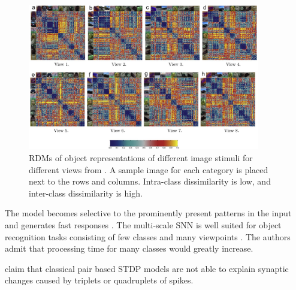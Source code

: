 \begin{figure}[htbp]
    \center
    \includegraphics[width=0.9\textwidth]{pictures/inter_intra_category_dissimilarity.jpg}
    \caption{\acp{RDM} of object representations of different image stimuli for different views from \cite{multi_scale_STDP}.
    A sample image for each category is placed next to the rows and columns.
    Intra-class dissimilarity is low, and inter-class dissimilarity is high.}
    \label{fig:RDM_SNN}
\end{figure}
%
The model becomes selective to the prominently present patterns in the input and generates fast responses \cite{STDP_vis_feat}.
The multi-scale \ac{SNN} is well suited for object recognition tasks consisting of few classes and many viewpoints \cite{multi_scale_STDP}.
The authors admit that processing time for many classes would greatly increase.

\authorsSTDPtriplet{} \cite{STDP_triplet} claim that classical pair based \ac{STDP} models 
are not able to explain synaptic changes caused by triplets or quadruplets of spikes.